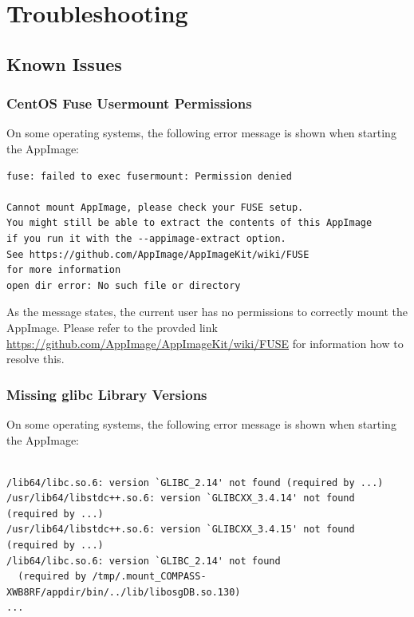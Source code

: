 \chapter{Troubleshooting}
\label{sec:troubleshooting}

\section{Known Issues}

\subsection{CentOS Fuse Usermount Permissions}

On some operating systems, the following error message is shown when starting the AppImage:

\begin{verbatim}
fuse: failed to exec fusermount: Permission denied

Cannot mount AppImage, please check your FUSE setup.
You might still be able to extract the contents of this AppImage 
if you run it with the --appimage-extract option. 
See https://github.com/AppImage/AppImageKit/wiki/FUSE 
for more information
open dir error: No such file or directory
\end{verbatim}


As the message states, the current user has no permissions to correctly mount the AppImage. Please refer to the provded link \url{https://github.com/AppImage/AppImageKit/wiki/FUSE} for information how to resolve this.

\subsection{Missing glibc Library Versions}

On some operating systems, the following error message is shown when starting the AppImage:\\\\

\begin{verbatim}
/lib64/libc.so.6: version `GLIBC_2.14' not found (required by ...)
/usr/lib64/libstdc++.so.6: version `GLIBCXX_3.4.14' not found (required by ...)
/usr/lib64/libstdc++.so.6: version `GLIBCXX_3.4.15' not found (required by ...)
/lib64/libc.so.6: version `GLIBC_2.14' not found 
  (required by /tmp/.mount_COMPASS-XWB8RF/appdir/bin/../lib/libosgDB.so.130)
...
\end{verbatim}

